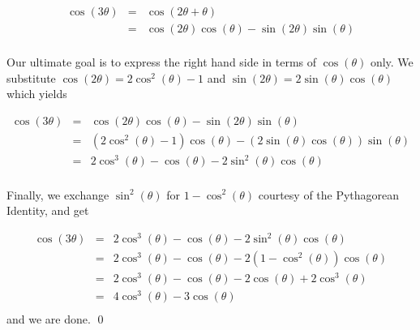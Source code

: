 \begin{ex}
\begin{enumerate}
\vspace{-.1in}

\[ \begin{array}{rcl}

\cos(3\theta) & = & \cos(2\theta + \theta) \\ [2pt]
              & = & \cos(2\theta)\cos(\theta) - \sin(2\theta)\sin(\theta) \\
\end{array}\]

Our ultimate goal is to express the right hand side in terms of $\cos(\theta)$ only.  We substitute $\cos(2\theta) = 2\cos^{2}(\theta) -1$ and $\sin(2\theta) = 2\sin(\theta)\cos(\theta)$ which yields

\vspace{-.1in}

\[ \begin{array}{rcl}

\cos(3\theta) & = &  \cos(2\theta)\cos(\theta) - \sin(2\theta)\sin(\theta) \\ [2pt]
              & = & \left(2\cos^{2}(\theta) - 1\right) \cos(\theta) - \left(2 \sin(\theta) \cos(\theta) \right)\sin(\theta) \\ [2pt] 
              & = & 2\cos^{3}(\theta)- \cos(\theta) - 2 \sin^2(\theta) \cos(\theta) \\
              
\end{array}\]

Finally, we exchange $\sin^{2}(\theta)$ for $1 - \cos^{2}(\theta)$ courtesy of the Pythagorean Identity, and get

\[ \begin{array}{rcl}

\cos(3\theta) & = & 2\cos^{3}(\theta)- \cos(\theta) - 2 \sin^2(\theta) \cos(\theta) \\ [2pt]
              & = & 2\cos^{3}(\theta)- \cos(\theta) - 2 \left(1 - \cos^{2}(\theta)\right) \cos(\theta) \\ [2pt]
              & = & 2\cos^{3}(\theta)- \cos(\theta) - 2\cos(\theta) + 2\cos^{3}(\theta) \\ [2pt]
              & = & 4\cos^{3}(\theta)- 3\cos(\theta) \\
\end{array}\]        
 and we are done.  \qed           
              
\end{enumerate}

\end{ex}

